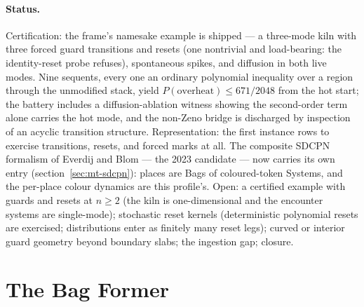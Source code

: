 \paragraph{Status.} Certification: the frame's namesake example is
shipped --- a three-mode kiln with three forced guard transitions and
resets (one nontrivial and load-bearing: the identity-reset probe
refuses), spontaneous spikes, and diffusion in both live modes. Nine
sequents, every one an ordinary polynomial inequality over a region
through the unmodified stack, yield $P(\text{overheat}) \le
671/2048$ from the hot start; the battery includes a
diffusion-ablation witness showing the second-order term alone
carries the hot mode, and the non-Zeno bridge is discharged by
inspection of an acyclic transition structure. Representation: the
first instance rows to exercise transitions, resets, and forced
marks at all. The composite SDCPN formalism of Everdij and Blom ---
the 2023 candidate --- now carries its own entry
(section~\ref{sec:mt-sdcpn}): places are Bags of coloured-token
Systems, and the per-place colour dynamics are this profile's. Open: a certified
example with guards and resets at $n \ge 2$ (the kiln is
one-dimensional and the encounter systems are single-mode);
stochastic reset kernels (deterministic polynomial resets are
exercised; distributions enter as finitely many reset legs); curved
or interior guard geometry beyond boundary slabs; the ingestion gap;
closure.



\section{The Bag Former}
\label{sec:mt-bag}

